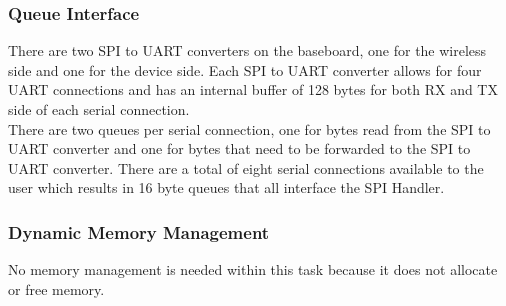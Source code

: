 \subsubsection{Queue Interface}
There are two SPI to UART converters on the baseboard, one for the wireless side and one for the device side. Each SPI to UART converter allows for four UART connections and has an internal buffer of 128 bytes for both RX and TX side of each serial connection.\\
There are two queues per serial connection, one for bytes read from the SPI to UART converter and one for bytes that need to be forwarded to the SPI to UART converter. There are a total of eight serial connections available to the user which results in 16 byte queues that all interface the SPI Handler.
\subsubsection{Dynamic Memory Management}
No memory management is needed within this task because it does not allocate or free memory.
